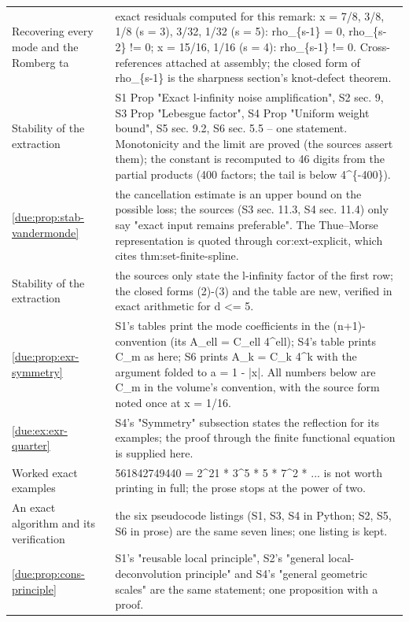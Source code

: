 \documentclass[11pt,oneside]{article}
\theoremstyle{plain}
\theoremstyle{definition}
\theoremstyle{remark}
\begin{document}
\begin{longtable}{@{}p{} p{}@{}}
Recovering every mode and the Romberg ta & exact residuals computed for this remark: x = 7/8, 3/8, 1/8 (s = 3), 3/32, 1/32 (s = 5): rho\_\{s-1\} = 0, rho\_\{s-2\} != 0; x = 15/16, 1/16 (s = 4): rho\_\{s-1\} != 0. Cross-references attached at assembly; the closed form of rho\_\{s-1\} is the sharpness section's knot-defect theorem.\\
Stability of the extraction & S1 Prop "Exact l-infinity noise amplification", S2 sec. 9, S3 Prop "Lebesgue factor", S4 Prop "Uniform weight bound", S5 sec. 9.2, S6 sec. 5.5 -- one statement. Monotonicity and the limit are proved (the sources assert them); the constant is recomputed to 46 digits from the partial products (400 factors; the tail is below 4\textasciicircum \{-400\}).\\
\cref{due:prop:stab-vandermonde} & the cancellation estimate is an upper bound on the possible loss; the sources (S3 sec. 11.3, S4 sec. 11.4) only say "exact input remains preferable". The Thue--Morse representation is quoted through cor:ext-explicit, which cites thm:set-finite-spline.\\
Stability of the extraction & the sources only state the l-infinity factor of the first row; the closed forms (2)-(3) and the table are new, verified in exact arithmetic for d <= 5.\\
\cref{due:prop:exr-symmetry} & S1's tables print the mode coefficients in the (n+1)-convention (its A\_ell = C\_ell 4\textasciicircum ell); S4's table prints C\_m as here; S6 prints A\_k = C\_k 4\textasciicircum k with the argument folded to a = 1 - |x|. All numbers below are C\_m in the volume's convention, with the source form noted once at x = 1/16.\\
\cref{due:ex:exr-quarter} & S4's "Symmetry" subsection states the reflection for its examples; the proof through the finite functional equation is supplied here.\\
Worked exact examples & 561842749440 = 2\textasciicircum 21 * 3\textasciicircum 5 * 5 * 7\textasciicircum 2 * ... is not worth printing in full; the prose stops at the power of two.\\
An exact algorithm and its verification & the six pseudocode listings (S1, S3, S4 in Python; S2, S5, S6 in prose) are the same seven lines; one listing is kept.\\
\cref{due:prop:cons-principle} & S1's "reusable local principle", S2's "general local-deconvolution principle" and S4's "general geometric scales" are the same statement; one proposition with a proof.\\

\end{longtable}
\end{document}
